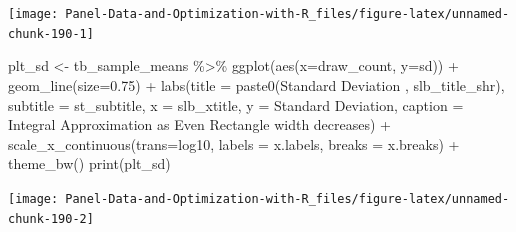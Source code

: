 \documentclass[
]{book}
\newenvironment{Shaded}{\begin{snugshade}}{\end{snugshade}}
\newcommand{\AttributeTok}[1]{\textcolor[rgb]{0.77,0.63,0.00}{#1}}
\newcommand{\FloatTok}[1]{\textcolor[rgb]{0.00,0.00,0.81}{#1}}
\newcommand{\FunctionTok}[1]{\textcolor[rgb]{0.00,0.00,0.00}{#1}}
\newcommand{\NormalTok}[1]{#1}
\newcommand{\OtherTok}[1]{\textcolor[rgb]{0.56,0.35,0.01}{#1}}
\newcommand{\SpecialCharTok}[1]{\textcolor[rgb]{0.00,0.00,0.00}{#1}}
\newcommand{\StringTok}[1]{\textcolor[rgb]{0.31,0.60,0.02}{#1}}
\begin{document}
\begin{center}\texttt{[image: Panel-Data-and-Optimization-with-R\_files/figure-latex/unnamed-chunk-190-1]} \end{center}

\begin{Shaded}
\begin{Highlighting}[]
\NormalTok{plt\_sd }\OtherTok{\textless{}{-}}\NormalTok{ tb\_sample\_means }\SpecialCharTok{\%\textgreater{}\%}
  \FunctionTok{ggplot}\NormalTok{(}\FunctionTok{aes}\NormalTok{(}\AttributeTok{x=}\NormalTok{draw\_count, }\AttributeTok{y=}\NormalTok{sd)) }\SpecialCharTok{+}
  \FunctionTok{geom\_line}\NormalTok{(}\AttributeTok{size=}\FloatTok{0.75}\NormalTok{) }\SpecialCharTok{+}
  \FunctionTok{labs}\NormalTok{(}\AttributeTok{title =} \FunctionTok{paste0}\NormalTok{(}\StringTok{\textquotesingle{}Standard Deviation \textquotesingle{}}\NormalTok{, slb\_title\_shr),}
       \AttributeTok{subtitle =}\NormalTok{ st\_subtitle,}
       \AttributeTok{x =}\NormalTok{ slb\_xtitle,}
       \AttributeTok{y =} \StringTok{\textquotesingle{}Standard Deviation\textquotesingle{}}\NormalTok{,}
       \AttributeTok{caption =} \StringTok{\textquotesingle{}Integral Approximation as Even Rectangle width decreases\textquotesingle{}}\NormalTok{) }\SpecialCharTok{+}
  \FunctionTok{scale\_x\_continuous}\NormalTok{(}\AttributeTok{trans=}\StringTok{\textquotesingle{}log10\textquotesingle{}}\NormalTok{, }\AttributeTok{labels =}\NormalTok{ x.labels, }\AttributeTok{breaks =}\NormalTok{ x.breaks) }\SpecialCharTok{+}
  \FunctionTok{theme\_bw}\NormalTok{()}
\FunctionTok{print}\NormalTok{(plt\_sd)}
\end{Highlighting}
\end{Shaded}

\begin{center}\texttt{[image: Panel-Data-and-Optimization-with-R\_files/figure-latex/unnamed-chunk-190-2]} \end{center}
\end{document}
